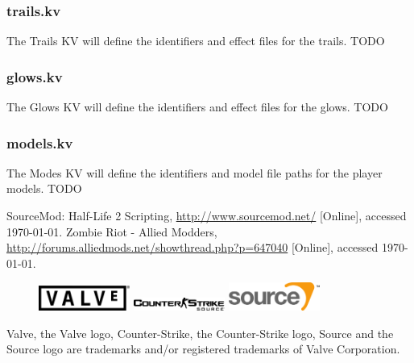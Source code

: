 \documentclass[a4paper, 11pt]{article}
\begin{document}
\subsubsection{trails.kv}
The Trails KV will define the identifiers and effect files for the trails.
TODO

\subsubsection{glows.kv}
The Glows KV will define the identifiers and effect files for the glows.
TODO

\subsubsection{models.kv}
The Modes KV will define the identifiers and model file paths for the player models.
TODO

\vfill
\begin{thebibliography}{9}
SourceMod: Half-Life 2 Scripting, \url{http://www.sourcemod.net/} [Online], accessed \today.
Zombie Riot - Allied Modders, \url{http://forums.alliedmods.net/showthread.php?p=647040} [Online], accessed \today.
\end{thebibliography}
\begin{figure}[h!]
\includegraphics[width=3cm]{Valve_logo.pdf}
\hfill
\includegraphics[width=3cm]{Counter-Strike_Source_logo.pdf}
\hfill
\includegraphics[width=3cm]{Source_engine_logo.pdf}
\end{figure}
Valve, the Valve logo, Counter-Strike, the Counter-Strike logo, Source and the Source logo are trademarks and/or registered trademarks of Valve Corporation.
\end{document}
